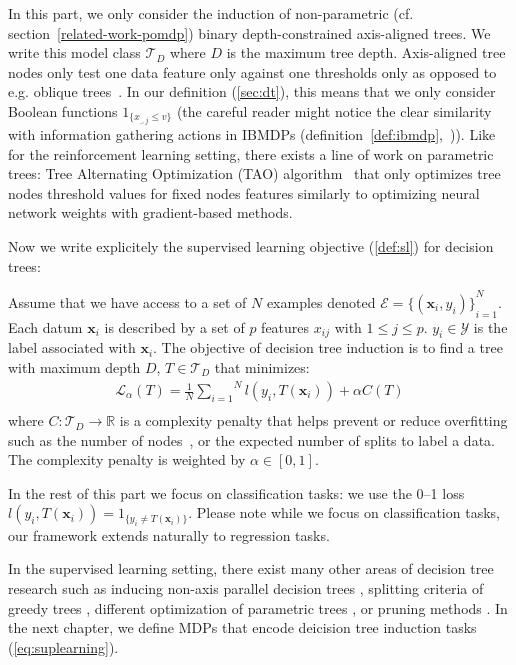 In this part, we only consider the induction of non-parametric (cf. section~\ref{related-work-pomdp}) binary depth-constrained axis-aligned trees. 
We write this model class $\mathcal{T}_D$ where $D$ is the maximum tree depth.
Axis-aligned tree nodes only test one data feature only against one thresholds only as opposed to e.g. oblique trees~\cite{murthy1994system}.
In our definition (\ref{sec:dt}), this means that we only consider Boolean functions $1_{\{x_{\_, j} \leq v\}}$ (the careful reader might notice the clear similarity with information gathering actions in IBMDPs (definition~\ref{def:ibmdp},~\cite{topin2021iterative})).
Like for the reinforcement learning setting, there exists a line of work on parametric trees: Tree Alternating Optimization (TAO) algorithm~\cite{NEURIPS2018_185c29dc,9534446,10.1145/3412815.3416882} that only optimizes tree nodes threshold values for fixed nodes features similarly to optimizing neural network weights with gradient-based methods. 

Now we write explicitely the supervised learning objective (\ref{def:sl}) for decision trees:

\begin{definition}\label{eq:suplearning}
    Assume that we have access to a set of $N$ examples denoted $\mathcal{E} = {\{(\boldsymbol{x}_i, y_i)\}}_{i=1}^N$. Each datum $\boldsymbol{x}_i$ is described by a set of $p$ features $x_{ij}$ with $1\leq j \leq p$. $y_i \in {\mathcal Y}$ is the label associated with $\boldsymbol{x}_i$. The objective of decision tree induction is to find a tree with maximum depth $D$, $T \in \mathcal{T}_D$ that minimizes:
    \begin{align*}
        {\mathcal L}_\alpha(T) = \frac{1}{N}\overset{N}{\underset{i=1}{\sum}}{l}(y_i, T(\boldsymbol{x}_i)) + \alpha C(T) \\
\end{align*}
where $C: \mathcal{T}_D \rightarrow \mathbb{R}$ is a complexity penalty that helps prevent or reduce overfitting such as the number of nodes~\cite{breiman1984classification,quantbnb}, or the expected number of splits to label a data\cite{how-eff}. The complexity penalty is weighted by $\alpha \in [0, 1]$. %
\end{definition}

In the rest of this part we focus on classification tasks: we use the 0--1 loss $l(y_i, T(\boldsymbol{x}_i)) = 1_{\{y_i\neq T(\boldsymbol{x}_i)\}}$.
Please note while we focus on classification tasks, our framework extends naturally to regression tasks.

In the supervised learning setting, there exist many other areas of decision tree research \cite{loh2014fifty} such as inducing non-axis parallel decision trees \cite{murthy1994system,10.1145/3637528.3671903}, splitting criteria of greedy trees \cite{vanderlinden2024optimalgreedydecisiontrees}, different optimization of parametric trees \cite{NIPS2015_1579779b,10.5555/3327757.3327770}, or pruning methods \cite{pruning1,pruning2}.
In the next chapter, we define MDPs that encode deicision tree induction tasks (\ref{eq:suplearning}).